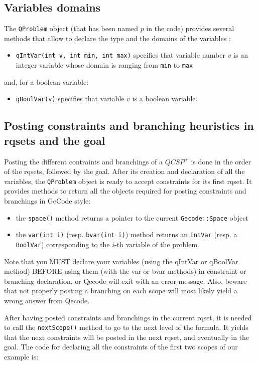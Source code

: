 \documentclass{article}
\begin{document}
\subsection{Variables domains}
The {\tt QProblem} object (that has been named $p$ in the code) provides several methods that allow to declare the type and the domains of the variables : 
\begin{itemize}
\item {\tt qIntVar(int v, int min, int max)} specifies that variable number $v$ is an integer variable whose domain is ranging from {\tt min} to {\tt max}
\end{itemize}
and, for a boolean variable: 
\begin{itemize}
\item {\tt qBoolVar(v)} specifies that variable $v$ is a boolean variable.
\end{itemize}


\subsection{Posting constraints and branching heuristics in rqsets and the goal}
Posting the different contraints and branchings of a $QCSP^+$ is done in the order of the rqsets, followed by the goal. After its creation and declaration of all the variables, the {\tt QProblem} object is ready to accept constraints for its first rqset. It provides methods to return all the objects required for posting constraints and branchings in GeCode style: 
\begin{itemize}
  \item the {\tt space()} method returns a pointer to the current {\tt Gecode::Space} object
  \item the {\tt var(int i)} (resp. {\tt bvar(int i)}) method returns an {\tt IntVar} (resp. a {\tt BoolVar}) corresponding to the $i$-th variable of the problem. 
\end{itemize}

Note that you MUST declare your variables (using the qIntVar or qBoolVar method) BEFORE using them  (with the var or bvar methods) in constraint or branching declaration, or Qecode will exit with an error message.
Also, beware that not properly posting a branching on each scope will most likely yield a wrong answer from Qecode.

 After having posted constraints and branchings in the current rqset, it is needed to call the {\tt nextScope()} method to go to the next level of the formula. It yields that the next constraints will be posted in the next rqset, and eventually in the goal. The code for declaring all the constraints of the first two scopes of our example is: 
\end{document}

